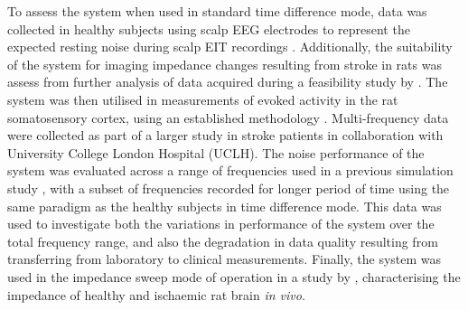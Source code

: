To assess the system when used in standard time difference mode, data was collected in healthy subjects using scalp EEG electrodes to represent the expected resting noise during scalp EIT recordings \cite{Fabrizi_2006,fabrizi2007analysis,Romsauerova2006}. Additionally, the suitability of the system for imaging impedance changes resulting from stroke in rats was assess from further analysis of data acquired during a feasibility study by \citet{Dowrick_2016}. The system was then utilised in measurements of evoked activity in the rat somatosensory cortex, using an established methodology \cite{Oh2011,Aristovich_2016}. Multi-frequency data were collected as part of a larger study in stroke patients in collaboration with University College London Hospital (UCLH). The noise performance of the system was evaluated across a range of frequencies used in a previous simulation study \cite{Malone2014a}, with a subset of frequencies recorded for longer period of time using the same paradigm as the healthy subjects in time difference mode. This data was used to investigate both the variations in performance of the system over the total frequency range, and also the degradation in data quality resulting from transferring from laboratory to clinical measurements. Finally, the system was used in the impedance sweep mode of operation in a study by \citet{Dowrick_2015}, characterising the impedance of healthy and ischaemic rat brain \emph{in vivo}. 

